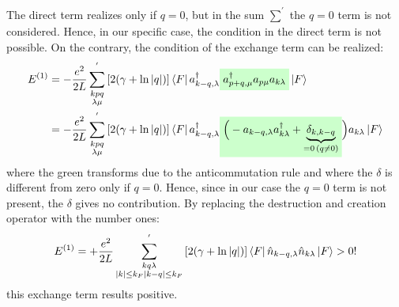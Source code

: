\documentclass[11pt, a4paper, twoside, openright]{article}
\begin{document}
\begin{itemize}
The direct term realizes only if  \( q=0 \), but  in the sum \( \sum_{}^{'}   \) the \( q=0 \) term is not considered. Hence, in our specific case, the condition in the direct term is not possible.
On the contrary, the condition of the exchange term can be realized:
\begin{equation*}
\begin{split}
  E^{(1)} &= - \frac{e^2}{2L} \sum_{\substack{k p q \\ \lambda \mu  } }^{'} \qty[  2 \qty( \gamma + \ln{\abs{q } }  ) ]
    \bra{F} a_{k-q, \lambda } ^\dag \mathcolorbox{green!20}{a_{p+q,\mu }^\dag  a_{p\mu } a_{k \lambda }} \ket{F}
   \\
   & =
   - \frac{e^2}{2L} \sum_{\substack{k p q \\ \lambda \mu  } }^{'} \qty[  2 \qty( \gamma + \ln{\abs{q } }  ) ]
     \bra{F} a_{k-q, \lambda } ^\dag \mathcolorbox{green!20}{
     \Big(-a_{k-q,\lambda  } a_{k \lambda } ^\dag  + \underbrace{\delta _{k,k-q}}_{=0\, (q \neq0)}  } \Big) a_{k \lambda} \ket{F}
\end{split}
\end{equation*}
where the green transforms due to the anticommutation rule and where the \( \delta  \) is different from zero only if \( q=0 \).  Hence, since in our case the \( q=0  \) term is not present, the \( \delta  \) gives no contribution.
By replacing the destruction and creation operator with the number ones:
\begin{equation*}
  E^{(1)} = + \frac{e^2}{2L} \sum_{\substack{k q \lambda  \\ \abs{k}\le k_F  \abs{k-q}\le k_F  } }^{'} \qty[  2 \qty( \gamma + \ln{\abs{q } }  ) ]
  \bra{F} \hat{n}_{k-q,\lambda } \hat{n}_{k \lambda } \ket{F}  >0!
\end{equation*}
this exchange term results positive.




\end{itemize}
\end{document}
